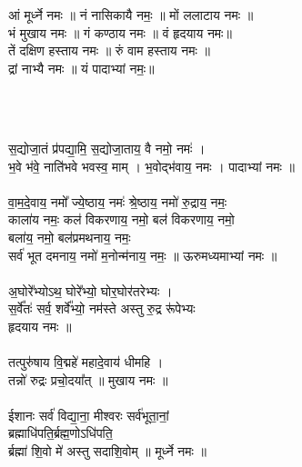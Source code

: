 \subsection{}
\\
आं मूर्ध्ने नमः ॥ नं नासिकायै नमः॒ ॥ मों ललाटाय नमः ॥\\
भं मुखाय नमः ॥ गं कण्ठाय नमः ॥  वं हृदयाय नमः॥\\
तें दक्षिण हस्ताय नमः ॥  रुं वाम हस्ताय नमः ॥\\
द्रां नाभ्यै नमः ॥ यं पादाभ्यां नमः॒॥\\
\\
\subsection{}
\\
स॒द्योजा॒तं प्र॑पद्या॒मि॒ स॒द्योजा॒ताय॒ वै नमो॒ नमः॑ ।\\
भ॒वे भ॑वे॒ नाति॑भवे भवस्व॒ माम् । भ॒वोद्भ॑वाय॒ नमः । पादाभ्यां नमः ॥\\
\\
वा॒म॒दे॒वाय॒ नमो᳚ ज्ये॒ष्ठाय॒ नमः॑  श्रे॒ष्ठाय॒ नमो॑ रु॒द्राय॒ नमः॒ \\
काला॑य नमः॒ कल॑ विकरणाय॒ नमो॒  बल॑ विकरणाय॒ नमो॒\\
बला॑य॒ नमो॒ बल॑प्रमथनाय॒ नमः॒ \\
सर्व॑ भूत दमनाय॒ नमो॑ म॒नोन्म॑नाय॒ नमः॒ ॥ ऊरुमध्यमाभ्यां नमः ॥\\
\\
अ॒घोरे᳚भ्योऽथ॒ घोरे᳚भ्यो॒ घोर॒घोर॑तरेभ्यः । \\
स॒र्वे᳚तः॑ सर्व॒ शर्वे᳚भ्यो॒ नम॑स्ते अस्तु रु॒द्र रू॑पेभ्यः\\
हृदयाय नमः ॥\\
\\
तत्पुरु॑षाय वि॒द्महे॑ महादे॒वाय॑ धीमहि । \\
तन्नो॑ रुद्रः प्रचो॒दया᳚त्  ॥ मुखाय नमः ॥\\
\\
ईशानः सर्व॑ विद्या॒ना॒ मीश्वरः सर्व॑भूता॒नां॒\\
ब्रह्माधि॑पति॒र्ब्रह्म॒णोऽधि॑पति॒ \\
र्ब्रह्मा॑ शि॒वो मे॑ अस्तु सदाशि॒वोम् ॥ मूर्ध्ने नमः ॥\\
